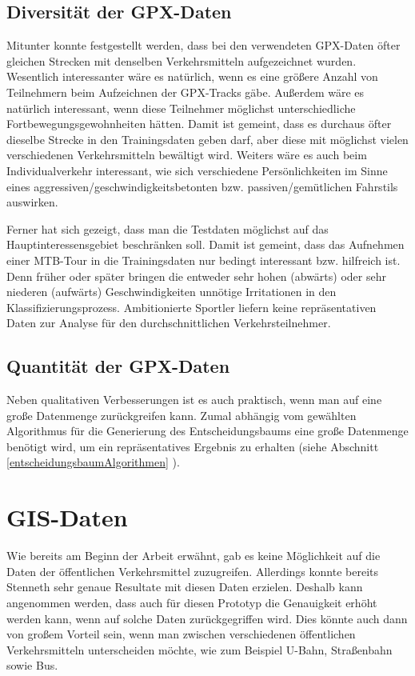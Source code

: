 \subsection{Diversität der GPX-Daten}
Mitunter konnte festgestellt werden, dass bei den verwendeten GPX-Daten öfter gleichen Strecken mit denselben Verkehrsmitteln aufgezeichnet wurden. Wesentlich interessanter wäre es natürlich, wenn es eine größere Anzahl von Teilnehmern beim Aufzeichnen der GPX-Tracks gäbe. Außerdem wäre es natürlich interessant, wenn diese Teilnehmer möglichst unterschiedliche Fortbewegungsgewohnheiten hätten. Damit ist gemeint, dass es durchaus öfter dieselbe Strecke in den Trainingsdaten geben darf, aber diese mit möglichst vielen verschiedenen Verkehrsmitteln bewältigt wird. Weiters wäre es auch beim Individualverkehr interessant, wie sich verschiedene Persönlichkeiten im Sinne eines aggressiven/geschwindigkeitsbetonten bzw. passiven/gemütlichen Fahrstils auswirken. 

Ferner hat sich gezeigt, dass man die Testdaten möglichst auf das Hauptinteressensgebiet beschränken soll. Damit ist gemeint, dass das Aufnehmen einer MTB-Tour in die Trainingsdaten nur bedingt interessant bzw. hilfreich ist. Denn früher oder später bringen die entweder sehr hohen (abwärts) oder sehr niederen (aufwärts) Geschwindigkeiten unnötige Irritationen in den Klassifizierungsprozess. Ambitionierte Sportler liefern keine repräsentativen Daten zur Analyse für den durchschnittlichen Verkehrsteilnehmer. 

\subsection{Quantität der GPX-Daten}
Neben qualitativen Verbesserungen ist es auch praktisch, wenn man auf eine große Datenmenge zurückgreifen kann. Zumal abhängig vom gewählten Algorithmus für die Generierung des Entscheidungsbaums eine große Datenmenge benötigt wird, um ein repräsentatives Ergebnis zu erhalten (siehe Abschnitt \ref{entscheidungsbaumAlgorithmen} ).

\section{GIS-Daten}
Wie bereits am Beginn der Arbeit erwähnt, gab es keine Möglichkeit auf die Daten der öffentlichen Verkehrsmittel zuzugreifen. Allerdings konnte bereits Stenneth \cite{stenneth_transportation_2011} sehr genaue Resultate mit diesen Daten erzielen. Deshalb kann angenommen werden, dass auch für diesen Prototyp die Genauigkeit erhöht werden kann, wenn auf solche Daten zurückgegriffen wird. Dies könnte auch dann von großem Vorteil sein, wenn man zwischen verschiedenen öffentlichen Verkehrsmitteln unterscheiden möchte, wie zum Beispiel U-Bahn, Straßenbahn sowie Bus. 

